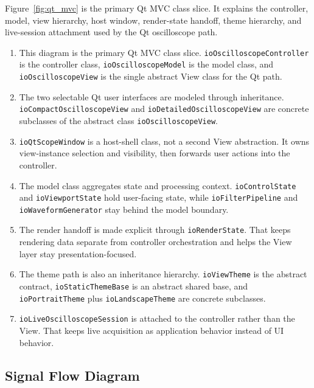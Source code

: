 Figure~\ref{fig:qt_mvc} is the primary Qt MVC class slice. It explains the controller, model, view hierarchy, host window, render-state handoff, theme hierarchy, and live-session attachment used by the Qt oscilloscope path.

\begin{enumerate}
    \item This diagram is the primary Qt MVC class slice. \texttt{ioOscilloscopeController} is the controller class, \texttt{ioOscilloscopeModel} is the model class, and \texttt{ioOscilloscopeView} is the single abstract View class for the Qt path.
    \item The two selectable Qt user interfaces are modeled through inheritance. \texttt{ioCompactOscilloscopeView} and \texttt{ioDetailedOscilloscopeView} are concrete subclasses of the abstract class \texttt{ioOscilloscopeView}.
    \item \texttt{ioQtScopeWindow} is a host-shell class, not a second View abstraction. It owns view-instance selection and visibility, then forwards user actions into the controller.
    \item The model class aggregates state and processing context. \texttt{ioControlState} and \texttt{ioViewportState} hold user-facing state, while \texttt{ioFilterPipeline} and \texttt{ioWaveformGenerator} stay behind the model boundary.
    \item The render handoff is made explicit through \texttt{ioRenderState}. That keeps rendering data separate from controller orchestration and helps the View layer stay presentation-focused.
    \item The theme path is also an inheritance hierarchy. \texttt{ioViewTheme} is the abstract contract, \texttt{ioStaticThemeBase} is an abstract shared base, and \texttt{ioPortraitTheme} plus \texttt{ioLandscapeTheme} are concrete subclasses.
    \item \texttt{ioLiveOscilloscopeSession} is attached to the controller rather than the View. That keeps live acquisition as application behavior instead of UI behavior.
\end{enumerate}

\subsection{Signal Flow Diagram}
\label{Section::Signal Flow Diagram}


